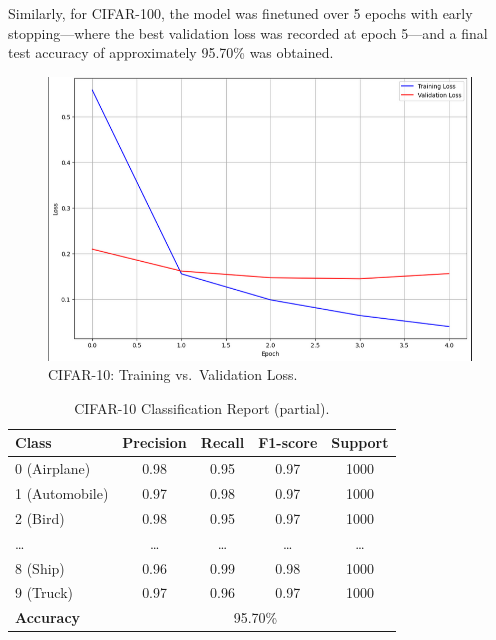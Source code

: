 \documentclass[conference]{IEEEtran}
\begin{document}
Similarly, for CIFAR-100, the model was finetuned
over 5 epochs with early stopping—where the best validation loss was recorded
at epoch 5—and a final test accuracy of approximately 95.70\% was obtained.

\begin{figure}[H]
    \centering
    \includegraphics[width=0.55\linewidth]{cifar10_train_val_loss.png}
    \caption{CIFAR-10: Training vs.\ Validation Loss.}
    \label{fig:cifar10_loss}
\end{figure}

\begin{table}[H]
    \centering
    \scriptsize
    \begin{tabular}{lcccc}
        \toprule
        \textbf{Class}    & \textbf{Precision}          & \textbf{Recall} & \textbf{F1-score} & \textbf{Support} \\
        \midrule
        0 (Airplane)      & 0.98                        & 0.95            & 0.97              & 1000             \\
        1 (Automobile)    & 0.97                        & 0.98            & 0.97              & 1000             \\
        2 (Bird)          & 0.98                        & 0.95            & 0.97              & 1000             \\
        \ldots            & \ldots                      & \ldots          & \ldots            & \ldots           \\
        8 (Ship)          & 0.96                        & 0.99            & 0.98              & 1000             \\
        9 (Truck)         & 0.97                        & 0.96            & 0.97              & 1000             \\
        \midrule
        \textbf{Accuracy} & \multicolumn{4}{c}{95.70\%}                                                          \\
        \bottomrule
    \end{tabular}
    \caption{CIFAR-10 Classification Report (partial).}
    \label{tab:cifar10_report}
\end{table}
\end{document}
